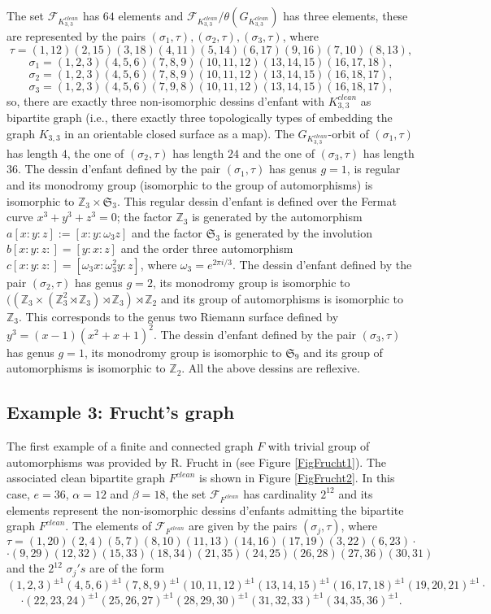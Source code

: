 \documentclass[12pt]{amsart}
\theoremstyle{remark}
\begin{document}
The set ${\mathcal F}_{K_{3,3}^{clean}}$ has $64$ elements and 
${\mathcal F}_{K_{3,3}^{clean}}/\theta(G_{K_{3,3}^{clean}})$ has three elements, these are represented by the pairs
$(\sigma_{1},\tau), (\sigma_{2},\tau), (\sigma_{3},\tau)$,
where
$$\tau=(1,12)(2,15)(3,18)(4,11)(5,14)(6,17)(9,16)(7,10)(8,13),$$
$$\sigma_{1}=(1,2,3)(4,5,6)(7,8,9)(10,11,12)(13,14,15)(16,17,18),$$ 
$$\sigma_{2}=(1,2,3)(4,5,6)(7,8,9)(10,11,12)(13,14,15)(16,18,17),$$
$$\sigma_{3}=(1,2,3)(4,5,6)(7,9,8)(10,11,12)(13,14,15)(16,18,17),$$
so, there are exactly three non-isomorphic dessins d'enfant with $K_{3,3}^{clean}$ as bipartite graph (i.e., there exactly three topologically types of embedding the graph $K_{3,3}$ in an orientable closed surface as a map). The $G_{K_{3,3}^{clean}}$-orbit of $(\sigma_1,\tau)$ has length $4$, the one of $(\sigma_2,\tau)$ has length $24$ and the one of $(\sigma_{3},\tau)$ has length $36$.
The dessin d'enfant defined by the pair $(\sigma_{1},\tau)$ has genus $g=1$, is regular and its monodromy group (isomorphic to 
the group of automorphisms) is isomorphic to ${\mathbb Z}_{3} \times {\mathfrak S}_{3}$. This regular dessin d'enfant is defined over the Fermat curve $x^3+y^3+z^3=0$; the factor ${\mathbb Z}_{3}$ is generated by the automorphism
$a[x:y:z]:=[x:y:\omega_{3}z]$ and the factor $ {\mathfrak S}_{3}$ is generated by the involution $b[x:y:z:]=[y:x:z]$ and the order three automorphism
$c[x:y:z:]=[\omega_{3}x:\omega_{3}^{2}y:z]$, where $\omega_{3}=e^{2 \pi i/3}$.
The dessin d'enfant defined by the pair $(\sigma_{2},\tau)$ has genus $g=2$, its monodromy group is isomorphic to 
$(({\mathbb Z}_{3} \times ({\mathbb Z}_{3}^{2} \rtimes {\mathbb Z}_{3})\rtimes {\mathbb Z}_{3})\rtimes {\mathbb Z}_{2}$ and its group of automorphisms is isomorphic to ${\mathbb Z}_{3}$. This corresponds to the genus two Riemann 
surface defined by $y^{3}=(x-1)(x^2+x+1)^{2}$.
The dessin d'enfant defined by the pair $(\sigma_{3},\tau)$ has genus $g=1$, its monodromy group is isomorphic to 
${\mathfrak S}_{9}$ and its group of automorphisms is isomorphic to ${\mathbb Z}_{2}$.
All the above dessins are reflexive.

\subsection{Example 3: Frucht's graph}
The first example of a finite and connected graph $F$ with trivial group of automorphisms was provided by R. Frucht in \cite{Frucht} (see Figure \ref{FigFrucht1}). The associated clean bipartite graph $F^{clean}$ is shown in Figure \ref{FigFrucht2}.  In this case, $e=36$, $\alpha=12$ and $\beta=18$, the set ${\mathcal F}_{F^{clean}}$ has cardinality $2^{12}$ and its elements represent the non-isomorphic dessins d'enfants admitting the bipartite graph  $F^{clean}$. The elements of ${\mathcal F}_{F^{clean}}$ are given by the pairs $(\sigma_j, \tau)$, where
$$\tau=(1,20)(2,4)(5,7)(8,10)(11,13)(14,16)(17,19)(3,22)(6,23)\cdot$$ $$\cdot(9,29)(12,32)(15,33)(18,34)(21,35)(24,25)(26,28)(27,36)(30,31)$$
and the $2^{12}$ $\sigma_j's$ are of the form
$$(1,2,3)^{\pm 1} (4,5,6)^{\pm 1} (7,8,9)^{\pm 1} (10,11,12)^{\pm 1} (13,14,15)^{\pm 1} (16,17,18)^{\pm 1} (19,20,21)^{\pm 1} \cdot$$
$$\cdot (22,23,24)^{\pm 1} (25,26,27)^{\pm 1} (28,29,30)^{\pm 1} (31,32,33)^{\pm 1} (34,35,36)^{\pm 1}.$$
\end{document}
